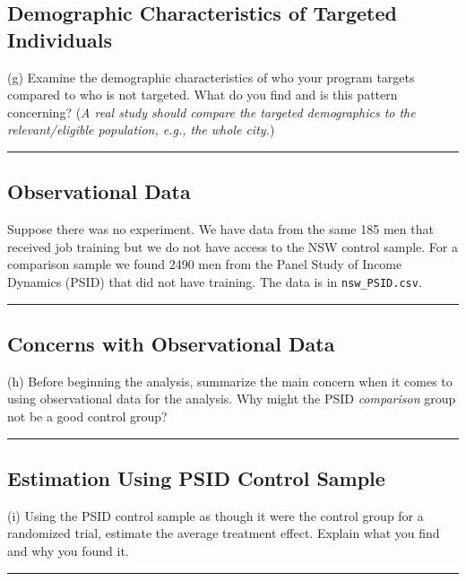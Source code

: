 \documentclass{article}
\newenvironment{colorparagraph}[1]{\par\color{#1}}{\par}
\begin{document}
\begin{colorparagraph}{questioncolor}
\label{q4h}\subsection{Demographic Characteristics of Targeted Individuals}
(g) Examine the demographic characteristics of who your program targets compared to who is not targeted. What do you find and is this pattern concerning? (\textit{A real study should compare the targeted demographics to the relevant/eligible population, e.g., the whole city.})

\rule{\textwidth}{0.5pt}
\end{colorparagraph}

\begin{colorparagraph}{questioncolor}
\label{q42}\subsection*{Observational Data}

Suppose there was no experiment. We have data from the same 185 men that received job training but we do not have access to the NSW control sample. For a comparison sample we found 2490 men from the Panel Study of Income Dynamics (PSID) that did not have training. The data is in \texttt{nsw\_PSID.csv}.

\rule{\textwidth}{0.5pt}
\end{colorparagraph}

\begin{colorparagraph}{questioncolor}
\label{q4h}\subsection{Concerns with Observational Data}
(h) Before beginning the analysis, summarize the main concern when it comes to using observational data for the analysis. Why might the PSID \textit{comparison} group not be a good control group?

\rule{\textwidth}{0.5pt}
\end{colorparagraph}

\begin{colorparagraph}{questioncolor}
\label{q4i}\subsection{Estimation Using PSID Control Sample}
(i) Using the PSID control sample as though it were the control group for a randomized trial, estimate the average treatment effect. Explain what you find and why you found it.

\rule{\textwidth}{0.5pt}
\end{colorparagraph}
\end{document}
